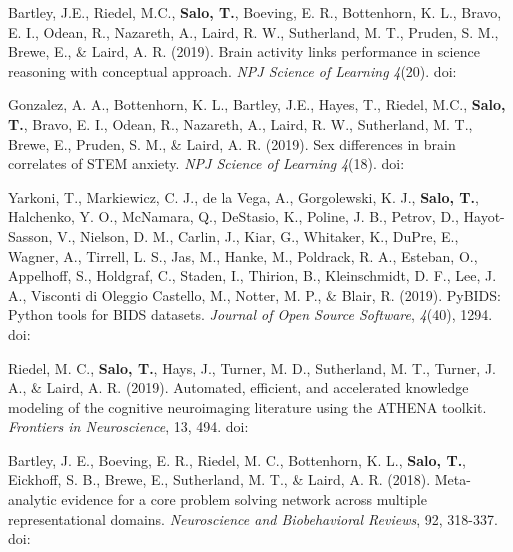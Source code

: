 \documentclass[10pt]{article}
\newcommand{\textlink}[3][blue]{\href{#2}{\color{#1}{#3}}}
\begin{document}
\begin{hangparas}{.25in}{1}
	\bigskip

	Bartley, J.E., Riedel, M.C., \textbf{Salo, T.}, Boeving, E. R., Bottenhorn, K. L.,
	Bravo, E. I., Odean, R., Nazareth, A., Laird, R. W., Sutherland, M. T.,
	Pruden, S. M., Brewe, E., \& Laird, A. R. (2019).
	Brain activity links performance in science reasoning with conceptual approach.
	\emph{NPJ Science of Learning} \emph{4}(20).
	doi:\textlink{https://doi.org/10.1038/s41539-019-0059-8}{10.1038/s41539-019-0059-8}

	\bigskip

	Gonzalez, A. A., Bottenhorn, K. L., Bartley, J.E., Hayes, T., Riedel, M.C.,
	\textbf{Salo, T.}, Bravo, E. I., Odean, R., Nazareth, A., Laird, R. W., Sutherland, M. T.,
	Brewe, E., Pruden, S. M., \& Laird, A. R. (2019).
	Sex differences in brain correlates of STEM anxiety.
	\emph{NPJ Science of Learning} \emph{4}(18).
	doi:\textlink{https://doi.org/10.1038/s41539-019-0058-9}{10.1038/s41539-019-0058-9}

	\bigskip

	Yarkoni, T., Markiewicz, C. J., de la Vega, A., Gorgolewski, K. J.,
	\textbf{Salo, T.}, Halchenko, Y. O., McNamara, Q., DeStasio, K.,
	Poline, J. B., Petrov, D., Hayot-Sasson, V., Nielson, D. M., Carlin, J.,
	Kiar, G., Whitaker, K., DuPre, E., Wagner, A., Tirrell, L. S., Jas, M.,
	Hanke, M., Poldrack, R. A., Esteban, O., Appelhoff, S., Holdgraf, C.,
	Staden, I., Thirion, B., Kleinschmidt, D. F., Lee, J. A.,
	Visconti di Oleggio Castello, M., Notter, M. P., \& Blair, R. (2019).
	PyBIDS: Python tools for BIDS datasets.
	\emph{Journal of Open Source Software}, \emph{4}(40), 1294.
	doi:\textlink{https://doi.org/10.21105/joss.01294}{10.21105/joss.01294}

	\bigskip

	Riedel, M. C., \textbf{Salo, T.}, Hays, J., Turner, M. D., Sutherland, M. T.,
	Turner, J. A., \& Laird, A. R. (2019).
	Automated, efficient, and accelerated knowledge modeling of the cognitive
	neuroimaging literature using the ATHENA toolkit.
	\emph{Frontiers in Neuroscience}, 13, 494.
	doi:\textlink{https://www.frontiersin.org/articles/10.3389/fnins.2019.00494/}{10.3389/fnins.2019.00494}

	\bigskip

	Bartley, J. E., Boeving, E. R., Riedel, M. C., Bottenhorn, K. L.,
	\textbf{Salo, T.}, Eickhoff, S. B., Brewe, E., Sutherland, M. T.,
	\& Laird, A. R. (2018).
	Meta-analytic evidence for a core problem solving network across multiple
	representational domains. \emph{Neuroscience and Biobehavioral Reviews}, 92, 318-337.
	doi:\textlink{https://doi.org/10.1016/j.neubiorev.2018.06.009}{10.1016/j.neubiorev.2018.06.009}


\end{hangparas}
\end{document}
